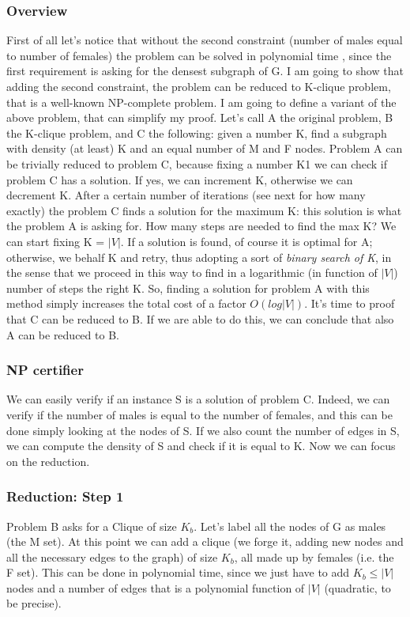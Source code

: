 \subsubsection{Overview}
First of all let's notice that without the second constraint (number of males equal to number of females) the problem can be solved in polynomial time \cite{Dense subgraph}, since the first requirement is asking for the densest subgraph of G. I am going to show that adding the second constraint, the problem can be reduced to K-clique problem, that is a well-known NP-complete problem. I am going to define a variant of the above problem, that can simplify my proof. Let's call A the original problem, B the K-clique problem, and C the following: given a number K, find a subgraph with density (at least) K and an equal number of M and F nodes.
Problem A can be trivially reduced to problem C, because fixing a number K1 we can check if problem C has a solution. If yes, we can increment K, otherwise we can decrement K. After a certain number of iterations (see next for how many exactly) the problem C finds a solution for the maximum K: this solution is what the problem A is asking for. How many steps are needed to find the max K? We can start fixing K = $|V|$. If a solution is found, of course it is optimal for A; otherwise, we behalf K and retry, thus adopting a sort of \textit{binary search of K}, in the sense that we proceed in this way to find in a logarithmic (in function of $|V|$) number of steps the right K. So, finding a solution for problem A with this method simply increases the total cost of a factor $O(log|V|)$. It's time to proof that C can be reduced to B. If we are able to do this, we can conclude that also A can be reduced to B.
\subsubsection{NP certifier}
We can easily verify if an instance S is a solution of problem C. Indeed, we can verify if the number of males is equal to the number of females, and this can be done simply looking at the nodes of S. If we also count the number of edges in S, we can compute the density of S and check if it is equal to K. Now we can focus on the reduction.
\subsubsection{Reduction: Step 1}
Problem B asks for a Clique of size $K_b$. Let's label all the nodes of G as males (the M set). At this point we can add a clique (we forge it, adding new nodes and all the necessary edges to the graph) of size $K_b$, all made up by females (i.e. the F set). This can be done in polynomial time, since we just have to add $K_b \leq |V|$ nodes and a number of edges that is a polynomial function of $|V|$ (quadratic, to be precise). 

